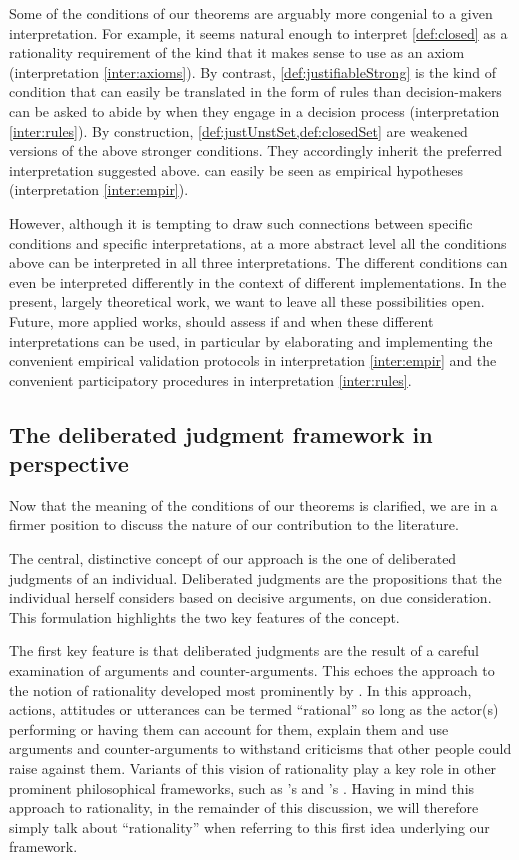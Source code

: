 \documentclass[version=3.21, pagesize, twoside=off, bibliography=totoc, DIV=calc, fontsize=12pt, a4paper]{scrartcl}
\begin{document}
Some of the conditions of our theorems are arguably more congenial to a given interpretation. For example, it seems natural enough to interpret \cref{def:closed} as a rationality requirement of the kind that it makes sense to use as an axiom (interpretation \ref{inter:axioms}). By contrast, \cref{def:justifiableStrong} is the kind of condition that can easily be translated in the form of rules than decision-makers can be asked to abide by when they engage in a decision process (interpretation \ref{inter:rules}). 
By construction, \cref{def:justUnstSet,def:closedSet}
are weakened versions of the above stronger conditions. They accordingly inherit the preferred interpretation suggested above.
 can easily be seen as empirical hypotheses (interpretation \ref{inter:empir}).

However, although it is tempting to draw such connections between specific conditions and specific interpretations, at a more abstract level all the conditions above can be interpreted in all three interpretations. The different conditions can even be interpreted differently in the context of different implementations. In the present, largely theoretical work, we want to leave all these possibilities open. Future, more applied works, should assess if and when these different interpretations can be used, in particular by elaborating and implementing the convenient empirical validation protocols in interpretation \ref{inter:empir} and the convenient participatory procedures in interpretation \ref{inter:rules}.

\subsection{The deliberated judgment framework in perspective}
\label{sec:pers}
Now that the meaning of the conditions of our theorems is clarified, we are in a firmer position to discuss the nature of our contribution to the literature.

The central, distinctive concept of our approach is the one of deliberated judgments of an individual. Deliberated judgments are the propositions that the individual herself considers based on decisive arguments, on due consideration. This formulation highlights the two key features of the concept.

	The first key feature is that deliberated judgments are the result of a careful examination of arguments and counter-arguments. This echoes the approach to the notion of rationality developed most prominently by \citet{habermas_theorie_1981}. In this approach, actions, attitudes or utterances can be termed “rational” so long as the actor(s) performing or having them can account for them, explain them and use arguments and counter-arguments to withstand criticisms that other people could raise against them. Variants of this vision of rationality play a key role in other prominent philosophical frameworks, such as \citeauthor{scanlon_what_2000}’s \citeyearpar{scanlon_what_2000} and \citeauthor{sen_idea_2009}’s \citeyearpar{sen_idea_2009}. Having in mind this approach to rationality, in the remainder of this discussion, we will therefore simply talk about “rationality” when referring to this first idea underlying our framework.
\end{document}
